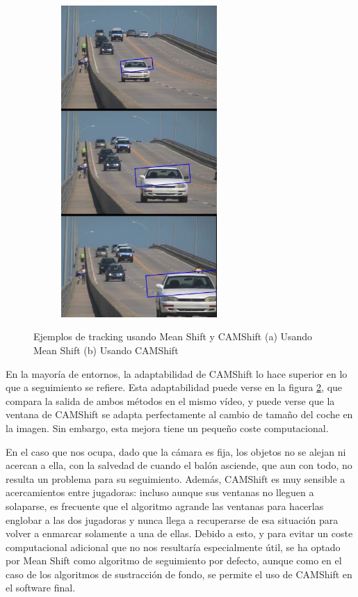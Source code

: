 \begin{figure}
\begin{subfigure}{.4\textwidth}
    \includegraphics[width=0.65\textwidth]{images/cochecamshift}
    \caption{ }
    \label{fig:ejemplos1b}
  \end{subfigure}
  \caption{Ejemplos de tracking usando Mean Shift y CAMShift (a) Usando Mean Shift (b) Usando CAMShift}
  \label{fig:ejemplos}
\end{figure}

En la mayoría de entornos, la adaptabilidad de CAMShift lo hace superior en lo que a seguimiento se refiere. Esta adaptabilidad puede verse en la figura \ref{fig:ejemplos}, que compara la salida de ambos métodos en el mismo vídeo, y puede verse que la ventana de CAMShift se adapta perfectamente al cambio de tamaño del coche en la imagen. Sin embargo, esta mejora tiene un pequeño coste computacional. 

En el caso que nos ocupa, dado que la cámara es fija, los objetos no se alejan ni acercan a ella, con la salvedad de cuando el balón asciende, que aun con todo, no resulta un problema para su seguimiento. Además, CAMShift es muy sensible a acercamientos entre jugadoras: incluso aunque sus ventanas no lleguen a solaparse, es frecuente que el algoritmo agrande las ventanas para hacerlas englobar a las dos jugadoras y nunca llega a recuperarse de esa situación para volver a enmarcar solamente a una de ellas. Debido a esto, y para evitar un coste computacional adicional que no nos resultaría especialmente útil, se ha optado por Mean Shift como algoritmo de seguimiento por defecto, aunque como en el caso de los algoritmos de sustracción de fondo, se permite el uso de CAMShift en el software final.

